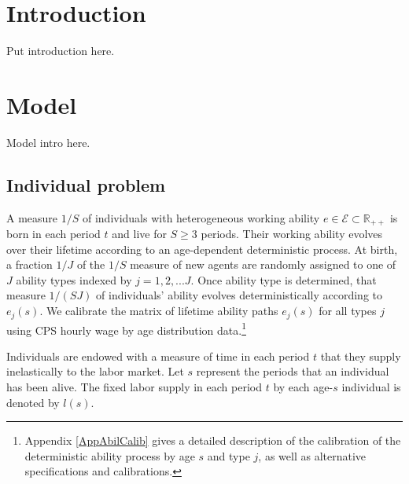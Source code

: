 \documentclass[letterpaper,12pt]{article}
\theoremstyle{definition}
\begin{document}
\begin{spacing}{1.5}

\section{Introduction}\label{SecIntro}

  Put introduction here.


\section{Model}\label{SecModel}

  Model intro here.


\subsection{Individual problem}\label{SecIndProb}

  A measure $1/S$ of individuals with heterogeneous working ability $e \in\mathcal{E}\subset\mathbb{R}_{++}$ is born in each period $t$ and live for $S\geq 3$ periods. Their working ability evolves over their lifetime according to an age-dependent deterministic process. At birth, a fraction $1/J$ of the $1/S$ measure of new agents are randomly assigned to one of $J$ ability types indexed by $j=1,2,...J$. Once ability type is determined, that measure $1/(SJ)$ of individuals' ability evolves deterministically according to $e_j(s)$. We calibrate the matrix of lifetime ability paths $e_j(s)$ for all types $j$ using CPS hourly wage by age distribution data.\footnote{Appendix \ref{AppAbilCalib} gives a detailed description of the calibration of the deterministic ability process by age $s$ and type $j$, as well as alternative specifications and calibrations.}

  Individuals are endowed with a measure of time in each period $t$ that they supply inelastically to the labor market. Let $s$ represent the periods that an individual has been alive. The fixed labor supply in each period $t$ by each age-$s$ individual is denoted by $l(s)$.


\end{spacing}
\end{document}
